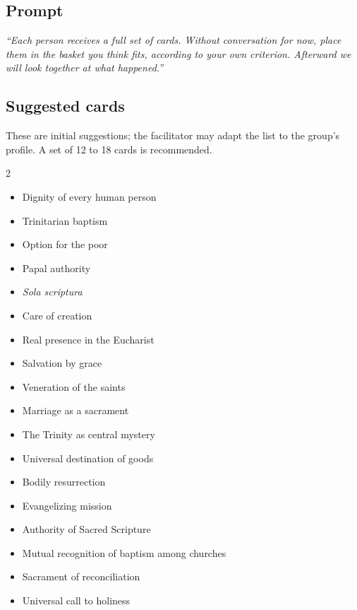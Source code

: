 \documentclass[11pt, a4paper]{article}
\begin{document}
\begin{actividad}
\subsection*{Prompt}
\emph{``Each person receives a full set of cards. Without conversation for now, place them in the basket you think fits, according to your own criterion. Afterward we will look together at what happened.''}

\subsection*{Suggested cards}
These are initial suggestions; the facilitator may adapt the list to the group's profile. A set of 12 to 18 cards is recommended.

\begin{multicols}{2}
\begin{itemize}[leftmargin=1.2em]
  \item Dignity of every human person
  \item Trinitarian baptism
  \item Option for the poor
  \item Papal authority
  \item \emph{Sola scriptura}
  \item Care of creation
  \item Real presence in the Eucharist
  \item Salvation by grace
  \item Veneration of the saints
  \item Marriage as a sacrament
  \item The Trinity as central mystery
  \item Universal destination of goods
  \item Bodily resurrection
  \item Evangelizing mission
  \item Authority of Sacred Scripture
  \item Mutual recognition of baptism among churches
  \item Sacrament of reconciliation
  \item Universal call to holiness
\end{itemize}
\end{multicols}


\end{actividad}
\end{document}
